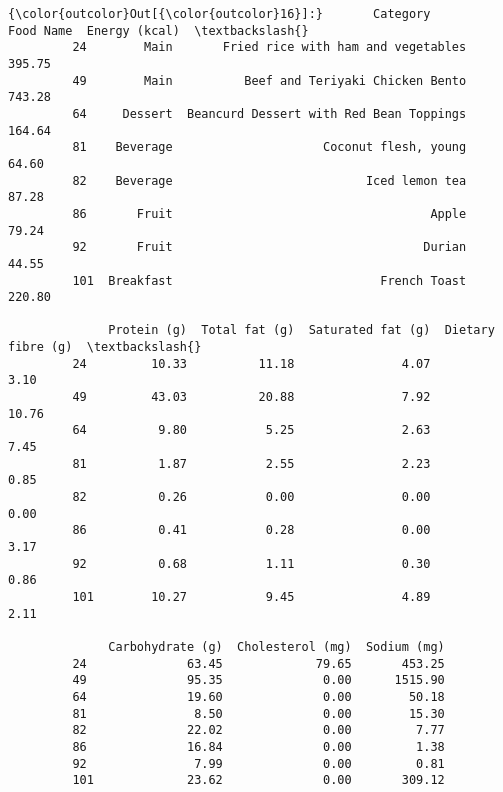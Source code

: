 \documentclass[11pt]{article}
\begin{document}
\begin{Verbatim}[commandchars=\\\{\}]
{\color{outcolor}Out[{\color{outcolor}16}]:}       Category                                Food Name  Energy (kcal)  \textbackslash{}
         24        Main       Fried rice with ham and vegetables         395.75   
         49        Main          Beef and Teriyaki Chicken Bento         743.28   
         64     Dessert  Beancurd Dessert with Red Bean Toppings         164.64   
         81    Beverage                     Coconut flesh, young          64.60   
         82    Beverage                           Iced lemon tea          87.28   
         86       Fruit                                    Apple          79.24   
         92       Fruit                                   Durian          44.55   
         101  Breakfast                             French Toast         220.80   
         
              Protein (g)  Total fat (g)  Saturated fat (g)  Dietary fibre (g)  \textbackslash{}
         24         10.33          11.18               4.07               3.10   
         49         43.03          20.88               7.92              10.76   
         64          9.80           5.25               2.63               7.45   
         81          1.87           2.55               2.23               0.85   
         82          0.26           0.00               0.00               0.00   
         86          0.41           0.28               0.00               3.17   
         92          0.68           1.11               0.30               0.86   
         101        10.27           9.45               4.89               2.11   
         
              Carbohydrate (g)  Cholesterol (mg)  Sodium (mg)  
         24              63.45             79.65       453.25  
         49              95.35              0.00      1515.90  
         64              19.60              0.00        50.18  
         81               8.50              0.00        15.30  
         82              22.02              0.00         7.77  
         86              16.84              0.00         1.38  
         92               7.99              0.00         0.81  
         101             23.62              0.00       309.12  
\end{Verbatim}
            

    
    
    
    
\end{document}
